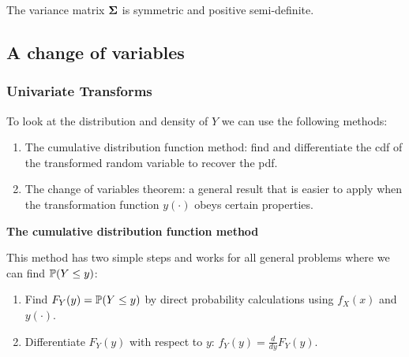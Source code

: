 \documentclass[10pt, a4paper]{article}
\begin{document}
\begin{proposition}
    The variance matrix $\mbf{\Sigma}$ is symmetric and positive semi-definite.
\end{proposition}

\subsection{A change of variables}

\subsubsection{Univariate Transforms}
To look at the distribution and density of $Y$ we can use the following methods:
\begin{enumerate}[label = (\Alph*)]
    \item The cumulative distribution function method:
    find and differentiate the cdf of the transformed random variable to recover the pdf.

    \item The change of variables theorem:
    a general result that is easier to apply when the transformation function $y(\cdot)$ obeys certain properties.
\end{enumerate}

\textbf{The cumulative distribution function method}

This method has two simple steps and works for all general problems where we can find $\P(Y \leq y)$:
\begin{enumerate}[label = \arabic*.]
    \item Find $F_Y(y) = \P(Y \leq y)$ by direct probability calculations using $f_X(x)$ and $y(\cdot)$.

    \item Differentiate $F_Y(y)$ with respect to $y$:
    $f_Y(y) = \frac{d}{dy}F_Y(y)$.
\end{enumerate}
\end{document}
